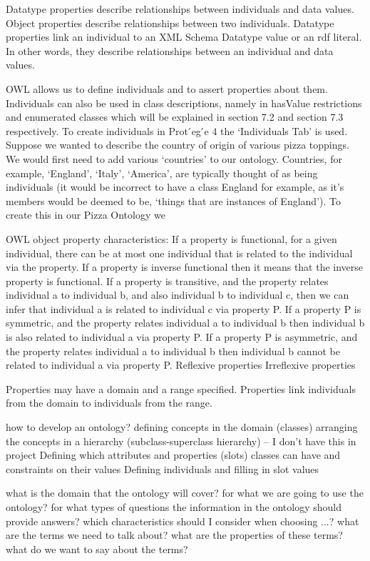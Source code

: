 \documentclass{sig-alternate}
\begin{document}
Datatype properties describe relationships between individuals and data values. Object properties describe relationships between two individuals.
Datatype properties link an individual to an XML Schema Datatype value or an rdf literal. In other words, they describe relationships between an individual and data values. 

OWL allows us to define individuals and to assert properties about them. Individuals can also be used in class descriptions, namely in hasValue restrictions and enumerated classes which will be explained in section 7.2 and section 7.3 respectively. To create individuals in Prot ́eg ́e 4 the ‘Individuals Tab’ is used.
Suppose we wanted to describe the country of origin of various pizza toppings. We would first need to add various ‘countries’ to our ontology. Countries, for example, ‘England’, ‘Italy’, ‘America’, are typically thought of as being individuals (it would be incorrect to have a class England for example, as it’s members would be deemed to be, ‘things that are instances of England’). To create this in our Pizza Ontology we


OWL object property characteristics:
If a property is functional, for a given individual, there can be at most one individual that is related to the individual via the property. 
If a property is inverse functional then it means that the inverse property is functional. 
If a property is transitive, and the property relates individual a to individual b, and also individual b to individual c, then we can infer that individual a is related to individual c via property P. 
If a property P is symmetric, and the property relates individual a to individual b then individual b is also related to individual a via property P.
If a property P is asymmetric, and the property relates individual a to individual b then individual b cannot be related to individual a via property P. 
Reflexive properties
Irreflexive properties

Properties may have a domain and a range specified. Properties link individuals from the domain to individuals from the range. 



how to develop an ontology?
defining concepts in the domain (classes)
arranging the concepts in a hierarchy (subclass-superclass hierarchy) -- I don't have this in project
Defining which attributes and properties (slots) classes can have and constraints on their values
Defining individuals and filling in slot values

what is the domain that the ontology will cover? for what we are going to use the ontology? for what types of questions the information in the ontology should provide answers?
which characteristics should I consider when choosing ...?
what are the terms we need to talk about?
what are the properties of these terms?
what do we want to say about the terms?
\end{document}

